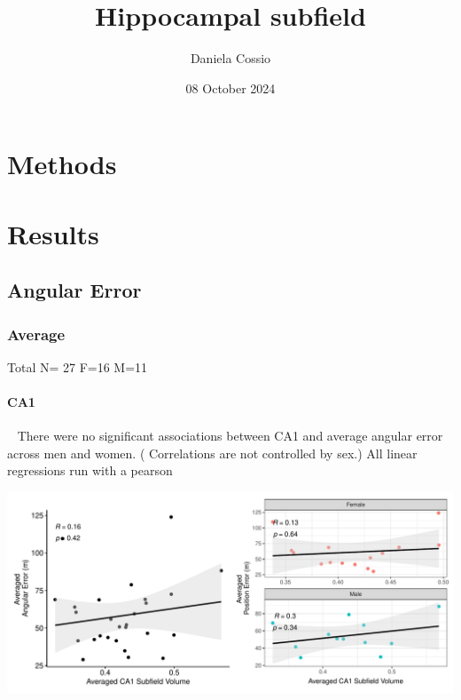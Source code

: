 \documentclass[
]{article}
\title{Hippocampal subfield}
\author{Daniela Cossio}
\date{08 October 2024}
\begin{document}
\maketitle

{
\setcounter{tocdepth}{3}
\tableofcontents
}
\newpage

\section{Methods}

\vspace{1cm}
\vspace{1cm}

\section{Results}
\vspace{1cm}
\subsection{Angular Error}
\vspace{1cm}

\subsubsection{Average}

Total N= 27 F=16 M=11

\paragraph{CA1}

~ There were no significant associations between CA1 and average angular
error across men and women. ( Correlations are not controlled by sex.)
All linear regressions run with a pearson \vspace{1cm}

\includegraphics{hippocampal_subfield_files/figure-latex/unnamed-chunk-1-1.pdf}
\end{document}
